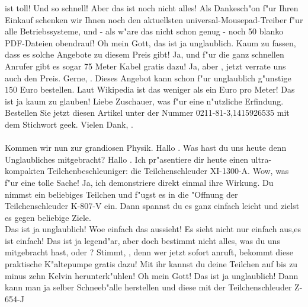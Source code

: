 \begin{verseplay}[7em]
                ist toll!
\s{\QEDGuestA} Und so schnell! Aber das ist noch nicht alles! Als 
                Dankesch"on f"ur Ihren Einkauf schenken wir Ihnen noch den 
                aktuellsten universal-Mousepad-Treiber f"ur alle Betriebssysteme, 
                und - als w"are das nicht schon genug - noch 50 blanko PDF-Dateien 
                obendrauf!
\s{\QEDHost} Oh mein Gott, das ist ja unglaublich. Kaum zu fassen, dass es 
                solche Angebote zu diesem Preis gibt!
\s{\QEDGuestA} Ja, und f"ur die ganz schnellen Anrufer gibt es sogar 75 
                Meter Kabel gratis dazu! 
\s{\QEDHost} Ja, aber \QEDGuestA, jetzt verrate uns auch den Preis.
\s{\QEDGuestA} Gerne, \QEDHost. Dieses Angebot kann schon f"ur unglaublich 
                g"unstige $150$ Euro bestellen. Laut Wikipedia ist das weniger als 
                ein Euro pro Meter!
\s{\QEDHost} Das ist ja kaum zu glauben! Liebe Zuschauer, was f"ur eine 
                n"utzliche Erfindung. Bestellen Sie jetzt diesen Artikel unter der 
                Nummer 0211-81-3,1415926535 mit dem Stichwort geek.
                Vielen Dank, \QEDGuestA.\\
                \\
                Kommen wir nun zur grandiosen Physik. Hallo \QEDGuestB. Was hast 
                du uns heute denn Unglaubliches mitgebracht?
\s{\QEDGuestB} Hallo \QEDHost. Ich pr"asentiere dir heute einen 
                ultra-kompakten Teilchenbeschleuniger: die Teilchenschleuder 
                XI-1300-A.
\s{\QEDHost} Wow, was f"ur eine tolle Sache!
\s{\QEDGuestB} Ja, ich demonstriere direkt einmal ihre  Wirkung. Du nimmst 
                ein beliebiges Teilchen und f"ugst es in die "Offnung der 
                Teilchenschleuder K-807-V ein. Dann spannst du es ganz einfach 
                leicht und zielst es gegen beliebige Ziele.\\
\s{\QEDHost} Das ist ja unglaublich! Woe einfach das aussieht!
\s{\QEDGuestB} Es sieht nicht nur einfach aus,es ist einfach!
\s{\QEDHost} Das ist ja legend"ar,  aber doch bestimmt nicht alles, was du 
                uns mitgebracht hast, oder \QEDGuestB?
\s{\QEDGuestB} Stimmt, \QEDHost, denn wer jetzt sofort anruft, bekommt 
                diese praktische K"altepumpe gratis dazu! Mit ihr kannst du deine 
                Teilchen auf bis zu minus zehn Kelvin herunterk"uhlen!
\s{\QEDHost} Oh mein Gott! Das ist ja unglaublich! Dann kann man ja selber 
                Schneeb"alle herstellen und diese mit der Teilchenschleuder Z-654-J 

\end{verseplay}
